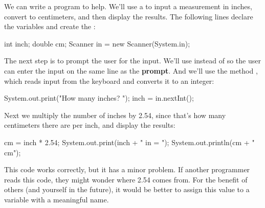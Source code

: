 
We can write a program to help.
We'll use a  to input a measurement in inches, convert to centimeters, and then display the results.
The following lines declare the variables and create the :

\begin{code}
int inch;
double cm;
Scanner in = new Scanner(System.in);
\end{code}


The next step is to prompt the user for the input.
We'll use  instead of  so the user can enter the input on the same line as the {\bf prompt}.
And we'll use the  method , which reads input from the keyboard and converts it to an integer:

\begin{code}
System.out.print("How many inches? ");
inch = in.nextInt();
\end{code}

Next we multiply the number of inches by 2.54, since that's how many centimeters there are per inch, and display the results:

\begin{code}
cm = inch * 2.54;
System.out.print(inch + " in = ");
System.out.println(cm + " cm");
\end{code}

This code works correctly, but it has a minor problem.
If another programmer reads this code, they might wonder where 2.54 comes from.
For the benefit of others (and yourself in the future), it would be better to assign this value to a variable with a meaningful name.



